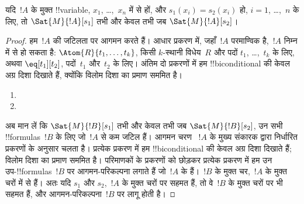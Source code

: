 \documentclass[../../../include/open-logic-section]{subfiles}
\begin{document}
\begin{prop}
यदि~$!A$ के मुक्त !!{variable}, $x_1$, \dots,~$x_n$ में से हों, और
$s_1(x_i) = s_2(x_i)$ हो, $i = 1$, \dots,~$n$ के लिए, तो
$\Sat{M}{!A}[s_1]$ तभी और केवल तभी जब $\Sat{M}{!A}[s_2]$।
\end{prop}

\begin{proof}
हम~$!A$ की जटिलता पर आगमन करते हैं। आधार प्रकरण में, जहाँ~$!A$ परमाण्विक
है,~$!A$ निम्न में से हो सकता है:
$\Atom{R}{t_1, \dots, t_k}$, किसी $k$-स्थानी विधेय~$R$ और पदों
$t_1$, \dots,~$t_k$ के लिए, अथवा $\eq[t_1][t_2]$, पदों~$t_1$ और~$t_2$
के लिए। अंतिम दो प्रकरणों में हम !!{biconditional} की केवल अग्र
दिशा दिखाते हैं, क्योंकि विलोम दिशा का प्रमाण सममित है।

\begin{enumerate}


\item
\item
\end{enumerate}

अब मान लें कि $\Sat{M}{!B}[s_1]$ तभी और केवल तभी जब
$\Sat{M}{!B}[s_2]$, उन सभी !!{formula}s~$!B$ के लिए जो~$!A$ से कम जटिल
हैं। आगमन चरण
~$!A$ के मुख्य संकारक द्वारा निर्धारित प्रकरणों के अनुसार चलता है। प्रत्येक
प्रकरण में हम !!{biconditional} की केवल अग्र दिशा दिखाते हैं; विलोम दिशा का
प्रमाण सममित है। परिमाणकों के प्रकरणों को छोड़कर प्रत्येक प्रकरण में हम उन
उप-!!{formula}s~$!B$ पर आगमन-परिकल्पना लगाते हैं जो~$!A$ के हैं।~$!B$ के मुक्त
चर,~$!A$ के मुक्त चरों में से हैं। अतः यदि $s_1$ और $s_2$,~$!A$ के मुक्त
चरों पर सहमत हैं, तो वे~$!B$ के मुक्त चरों पर भी सहमत हैं, और
आगमन-परिकल्पना~$!B$ पर लागू होती है।


\end{proof}
\end{document}
